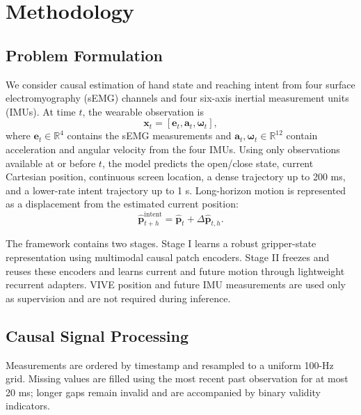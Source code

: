 
\section{Methodology}
\label{sec:methodology}

\subsection{Problem Formulation}

We consider causal estimation of hand state and reaching intent from four
surface electromyography (sEMG) channels and four six-axis inertial measurement
units (IMUs). At time $t$, the wearable observation is
\begin{equation}
    \mathbf{x}_t=[\mathbf{e}_t,\mathbf{a}_t,\boldsymbol{\omega}_t],
\end{equation}
where $\mathbf{e}_t\in\mathbb{R}^{4}$ contains the sEMG measurements and
$\mathbf{a}_t,\boldsymbol{\omega}_t\in\mathbb{R}^{12}$ contain acceleration and
angular velocity from the four IMUs. Using only observations available at or
before $t$, the model predicts the open/close state, current Cartesian
position, continuous screen location, a dense trajectory up to 200 ms, and a
lower-rate intent trajectory up to 1 s. Long-horizon motion is represented as
a displacement from the estimated current position:
\begin{equation}
    \hat{\mathbf p}^{\mathrm{intent}}_{t+h}
    =\hat{\mathbf p}_t+\Delta\hat{\mathbf p}_{t,h}.
\end{equation}

The framework contains two stages. Stage I learns a robust gripper-state
representation using multimodal causal patch encoders. Stage II freezes and
reuses these encoders and learns current and future motion through lightweight
recurrent adapters. VIVE position and future IMU measurements are used only as
supervision and are not required during inference.

\subsection{Causal Signal Processing}

Measurements are ordered by timestamp and resampled to a uniform 100-Hz grid.
Missing values are filled using the most recent past observation for at most
20 ms; longer gaps remain invalid and are accompanied by binary validity
indicators.


